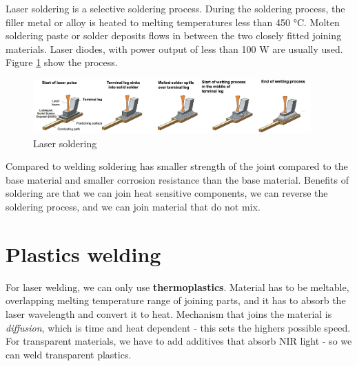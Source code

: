 Laser soldering is a selective soldering process.
 During the soldering process, the
filler metal or alloy is heated to melting temperatures less than 450 °C. 
Molten soldering paste or solder deposits flows in between the two closely fitted joining
materials. Laser diodes, with power output of less than 100 W are usually used. 
Figure \ref{fig:lsol} show the process.

\begin{figure}[h!]
    \centering
    \includegraphics[width=0.95\textwidth]{slike/lassol.png}
    \caption{Laser soldering}
    \label{fig:lsol}
\end{figure}

Compared to welding soldering  has smaller strength of the joint compared to the base material and smaller corrosion resistance 
than the base material. Benefits of soldering are that we can join heat sensitive components, we can reverse the soldering process, and we can join material that do not mix.

\section{Plastics welding}

For laser welding, we can only use \textbf{thermoplastics}. Material has to be meltable, overlapping melting temperature range of joining parts,
and it has to absorb the laser wavelength and convert it to heat.
Mechanism that joins the material is \textit{diffusion}, which is time and heat dependent - this sets the 
highers possible speed. For transparent materials, we have to add additives that absorb NIR light - so we can weld transparent plastics.

